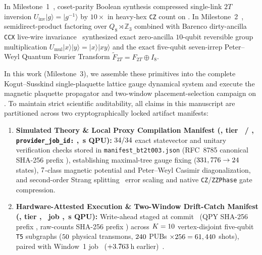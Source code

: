 \documentclass[aps,prx,twocolumn,superscriptaddress,nofootinbib]{revtex4-2}
\begin{document}
In Milestone~1~\cite{DavisBT2T001}, coset-parity Boolean synthesis compressed single-link $2T$ inversion $U_{\mathrm{inv}}|g\rangle = |g^{-1}\rangle$ by $10\times$ in heavy-hex \texttt{CZ} count on \BTPlaqFezBackend. In Milestone~2~\cite{DavisBT2T002}, semidirect-product factoring over $Q_8 \rtimes \mathbb{Z}_3$ combined with Barenco dirty-ancilla \texttt{CCX} live-wire invariance~\cite{Barenco1995} synthesized exact zero-ancilla $10$-qubit reversible group multiplication $U_{\mathrm{mul}}|x\rangle|y\rangle = |x\rangle|xy\rangle$ and the exact five-qubit seven-irrep Peter--Weyl Quantum Fourier Transform $\widetilde{F}_{2T} = F_{2T} \oplus I_8$.

In this work (Milestone~3), we assemble these primitives into the complete Kogut--Susskind single-plaquette lattice gauge dynamical system and execute the magnetic plaquette propagator and two-window placement-selection campaign on \BTPlaqFezBackend. To maintain strict scientific auditability, all claims in this manuscript are partitioned across two cryptographically locked artifact manifests:
\begin{enumerate}
\item \textbf{Simulated Theory \& Local Proxy Compilation Manifest (\BTPlaqSimExperimentId, tier \BTPlaqSimExecTier\ / \BTPlaqSimExactTier, \texttt{provider\_job\_id:} \BTPlaqSimJobId, \BTPlaqSimQpuSec\,s QPU):} $34/34$ exact statevector and unitary verification checks stored in \texttt{manifest\_bt2t003.json} (RFC~8785 canonical SHA-256 prefix \BTPlaqSimCanonicalShaPrefix), establishing maximal-tree gauge fixing ($331,776 \to 24$ states), $7$-class magnetic potential and Peter--Weyl Casimir diagonalization, and second-order Strang splitting~\cite{Strang1968} error scaling and native \texttt{CZ}/\texttt{ZZPhase} gate compression.
\item \textbf{Hardware-Attested Execution \& Two-Window Drift-Catch Manifest (\BTPlaqFezProtocolId, tier \BTPlaqFezExecTier, \BTPlaqFezBackend\ job \BTPlaqFezJobId, \BTPlaqFezQpuSec\,s QPU):} Write-ahead staged at commit \BTPlaqFezWriteAheadCommit\ (QPY SHA-256 prefix \BTPlaqFezQpyShaPrefix, raw-counts SHA-256 prefix \BTPlaqFezRawCountsShaPrefix) across $K = 10$ vertex-disjoint five-qubit \texttt{T5} subgraphs ($50$ physical transmons, $240$ PUBs $\times 256 = 61,440$ shots), paired with Window~1 job \BTPlaqFezWindowOneJobId\ ($+3.763$\,h earlier)~\cite{DavisBT2T003Archive}.
\end{enumerate}
\end{document}
